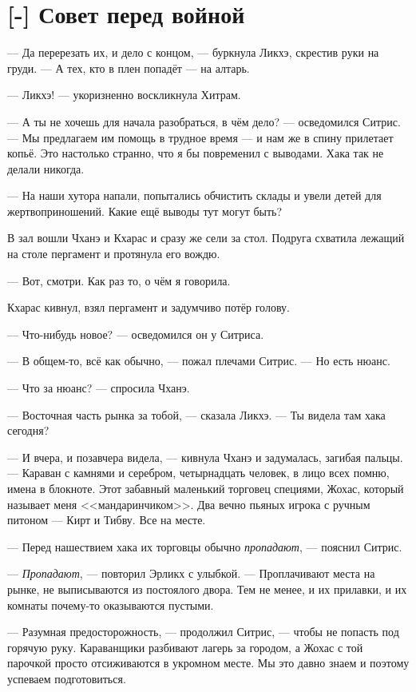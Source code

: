 \section{[-] Совет перед войной}

--- Да перерезать их, и дело с концом, --- буркнула Ликхэ, скрестив руки на груди.
--- А тех, кто в плен попадёт --- на алтарь.

--- Ликхэ! --- укоризненно воскликнула Хитрам.

--- А ты не хочешь для начала разобраться, в чём дело? --- осведомился Ситрис.
--- Мы предлагаем им помощь в трудное время --- и нам же в спину прилетает копьё.
Это настолько странно, что я бы повременил с выводами.
Хака так не делали никогда.

--- На наши хутора напали, попытались обчистить склады и увели детей для жертвоприношений.
Какие ещё выводы тут могут быть?

В зал вошли Чханэ и Кхарас и сразу же сели за стол.
Подруга схватила лежащий на столе пергамент и протянула его вождю.

--- Вот, смотри.
Как раз то, о чём я говорила.

Кхарас кивнул, взял пергамент и задумчиво потёр голову.

--- Что-нибудь новое? --- осведомился он у Ситриса.

--- В общем-то, всё как обычно, --- пожал плечами Ситрис.
--- Но есть нюанс.

--- Что за нюанс? --- спросила Чханэ.

--- Восточная часть рынка за тобой, --- сказала Ликхэ.
--- Ты видела там хака сегодня?

--- И вчера, и позавчера видела, --- кивнула Чханэ и задумалась, загибая пальцы.
--- Караван с камнями и серебром, четырнадцать человек, в лицо всех помню, имена в блокноте.
Этот забавный маленький торговец специями, Жохас, который называет меня <<мандаринчиком>>.
Два вечно пьяных игрока с ручным питоном --- Кирт и Тибву.
Все на месте.

--- Перед нашествием хака их торговцы обычно \emph{пропадают}, --- пояснил Ситрис.

--- \emph{Пропадают}, --- повторил Эрликх с улыбкой.
--- Проплачивают места на рынке, не выписываются из постоялого двора.
Тем не менее, и их прилавки, и их комнаты почему-то оказываются пустыми.

--- Разумная предосторожность, --- продолжил Ситрис, --- чтобы не попасть под горячую руку.
Караванщики разбивают лагерь за городом, а Жохас с той парочкой просто отсиживаются в укромном месте.
Мы это давно знаем и поэтому успеваем подготовиться.

